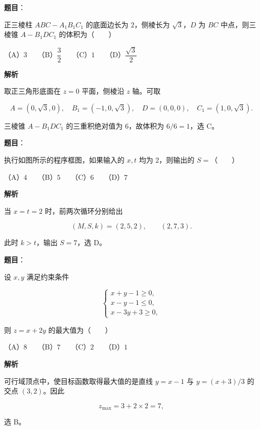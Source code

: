 \begin{answer}

\textbf{题目}：

正三棱柱 $ABC-A_1B_1C_1$ 的底面边长为 $2$，侧棱长为 $\sqrt3$，$D$ 为 $BC$ 中点，则三棱锥 $A-B_1DC_1$ 的体积为\mbox{（　　）}

（A）$3$　　（B）$\dfrac32$　　（C）$1$　　（D）$\dfrac{\sqrt3}{2}$

\textbf{解析}

取正三角形底面在 $z=0$ 平面，侧棱沿 $z$ 轴。可取

\nopagebreak[4]
\[
A=(0,\sqrt3,0),\quad B_1=(-1,0,\sqrt3),\quad D=(0,0,0),\quad C_1=(1,0,\sqrt3).
\]

三棱锥 $A-B_1DC_1$ 的三重积绝对值为 $6$，故体积为 $6/6=1$，选 C。


\end{answer}
\begin{answer}

\textbf{题目}：

执行如图所示的程序框图，如果输入的 $x,t$ 均为 $2$，则输出的 $S=$\mbox{（　　）}
\nopagebreak[4]
\begin{center}\end{center}
\nopagebreak[4]
（A）$4$　　（B）$5$　　（C）$6$　　（D）$7$

\textbf{解析}

当 $x=t=2$ 时，前两次循环分别给出

\nopagebreak[4]
\[
(M,S,k)=(2,5,2),\qquad(2,7,3).
\]

此时 $k>t$，输出 $S=7$，选 D。


\end{answer}
\begin{answer}

\textbf{题目}：

设 $x,y$ 满足约束条件

\nopagebreak[4]
\[
\begin{cases}
x+y-1\geqslant0,\\
x-y-1\leqslant0,\\
x-3y+3\geqslant0,
\end{cases}
\]

则 $z=x+2y$ 的最大值为\mbox{（　　）}

（A）$8$　　（B）$7$　　（C）$2$　　（D）$1$

\textbf{解析}

可行域顶点中，使目标函数取得最大值的是直线 $y=x-1$ 与 $y=(x+3)/3$ 的交点 $(3,2)$。因此

\nopagebreak[4]
\[
z_{\max}=3+2\times2=7,
\]

选 B。


\end{answer}
